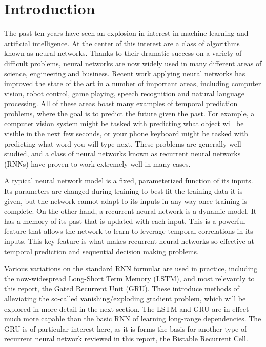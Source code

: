 \section{Introduction}

The past ten years have seen an explosion in interest in machine learning and artificial intelligence. At the center of this interest are a class of algorithms known as neural networks. Thanks to their dramatic success on a variety of difficult problems, neural networks are now widely used in many different areas of science, engineering and business. Recent work applying neural networks has improved the state of the art in a number of important areas, including computer vision, robot control, game playing, speech recognition and natural language processing. All of these areas boast many examples of temporal prediction problems, where the goal is to predict the future given the past. For example, a computer vision system might be tasked with predicting what object will be visible in the next few seconds, or your phone keyboard might be tasked with predicting what word you will type next. These problems are generally well-studied, and a class of neural networks known as recurrent neural networks (RNNs) have proven to work extremely well in many cases.

A typical neural network model is a fixed, parameterized function of its inputs. Its parameters are changed during training to best fit the training data it is given, but the network cannot adapt to its inputs in any way once training is complete.
On the other hand, a recurrent neural network is a dynamic model. It has a memory of its past that is updated with each input. This is a powerful feature that allows the network to learn to leverage temporal correlations in its inputs. This key feature is what makes recurrent neural networks so effective at temporal prediction and sequential decision making problems.

Various variations on the standard RNN formular are used in practice, including the now-widespread Long-Short Term Memory\cite{hochreiter1997lstm} (LSTM), and most relevantly to this report, the Gated Recurrent Unit\cite{cho2014gru} (GRU). These introduce methods of alleviating the so-called vanishing/exploding gradient problem, which will be explored in more detail in the next section. The LSTM and GRU are in effect much more capable than the basic RNN of learning long-range dependencies. The GRU is of particular interest here, as it is forms the basis for another type of recurrent neural network reviewed in this report, the Bistable Recurrent Cell\cite{vecoven2021brc}.

